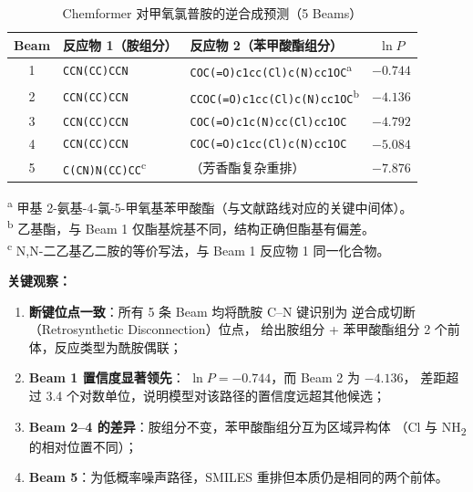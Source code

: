 \documentclass[a4paper, 12pt]{article}
\begin{document}
\begin{table}[H]
  \centering
  \caption{Chemformer 对甲氧氯普胺的逆合成预测（5 Beams）}
  \label{tab:retro_results}
  \small
  \begin{tabular}{cllc}
    \toprule
    \textbf{Beam} &
    \textbf{反应物 1（胺组分）} &
    \textbf{反应物 2（苯甲酸酯组分）} &
    \textbf{$\ln P$} \\
    \midrule
    1 & \texttt{CCN(CC)CCN}
      & \texttt{COC(=O)c1cc(Cl)c(N)cc1OC}\textsuperscript{a}
      & $-0.744$ \\[3pt]
    2 & \texttt{CCN(CC)CCN}
      & \texttt{CCOC(=O)c1cc(Cl)c(N)cc1OC}\textsuperscript{b}
      & $-4.136$ \\[3pt]
    3 & \texttt{CCN(CC)CCN}
      & \texttt{COC(=O)c1c(N)cc(Cl)cc1OC}
      & $-4.792$ \\[3pt]
    4 & \texttt{CCN(CC)CCN}
      & \texttt{COC(=O)c1cc(Cl)c(N)cc1OC}
      & $-5.084$ \\[3pt]
    5 & \texttt{C(CN)N(CC)CC}\textsuperscript{c}
      & （芳香酯复杂重排）
      & $-7.876$ \\
    \bottomrule
  \end{tabular}
  \vspace{4pt}

  \begin{minipage}{0.9\textwidth}
    \footnotesize
    \textsuperscript{a} 甲基 2-氨基-4-氯-5-甲氧基苯甲酸酯（与文献路线对应的关键中间体）。\\
    \textsuperscript{b} 乙基酯，与 Beam 1 仅酯基烷基不同，结构正确但酯基有偏差。\\
    \textsuperscript{c} N,N-二乙基乙二胺的等价写法，与 Beam 1 反应物 1 同一化合物。
  \end{minipage}
\end{table}

\textbf{关键观察：}
\begin{enumerate}[leftmargin=2em]
  \item \textbf{断键位点一致}：所有 5 条 Beam 均将酰胺 C--N 键识别为
        逆合成切断（Retrosynthetic Disconnection）位点，
        给出胺组分 + 苯甲酸酯组分 2 个前体，反应类型为酰胺偶联；
  \item \textbf{Beam 1 置信度显著领先}：
        $\ln P = -0.744$，而 Beam 2 为 $-4.136$，
        差距超过 3.4 个对数单位，说明模型对该路径的置信度远超其他候选；
  \item \textbf{Beam 2--4 的差异}：胺组分不变，苯甲酸酯组分互为区域异构体
        （Cl 与 NH\textsubscript{2} 的相对位置不同）；
  \item \textbf{Beam 5}：为低概率噪声路径，SMILES 重排但本质仍是相同的两个前体。
\end{enumerate}
\end{document}
